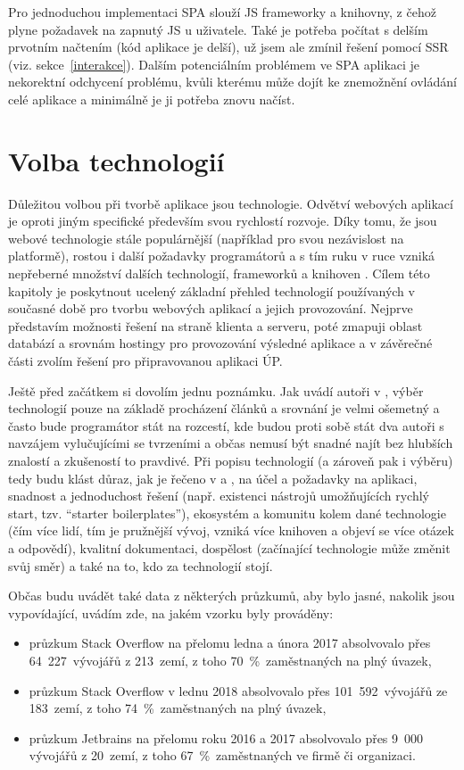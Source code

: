         Pro jednoduchou implementaci SPA slouží JS frameworky a knihovny, z čehož plyne požadavek na zapnutý JS u uživatele. Také je potřeba počítat s delším prvotním načtením (kód aplikace je delší), už jsem ale zmínil řešení pomocí SSR (viz. sekce~\ref{interakce}). Dalším potenciálním problémem ve SPA aplikaci je nekorektní odchycení problému, kvůli kterému může dojít ke znemožnění ovládání celé aplikace a minimálně je ji potřeba znovu načíst. \cite{spa1}

\chapter{Volba technologií}\label{technologie}
Důležitou volbou při tvorbě aplikace jsou technologie. Odvětví webových aplikací je oproti jiným specifické především svou rychlostí rozvoje. Díky tomu, že jsou webové technologie stále populárnější (například pro svou nezávislost na platformě), rostou i další požadavky programátorů a s tím ruku v ruce vzniká nepřeberné množství dalších technologií, frameworků a knihoven \cite{moderni-webapps,moderni-webapps2}. Cílem této kapitoly je poskytnout ucelený základní přehled technologií používaných v současné době pro tvorbu webových aplikací a jejich provozování. Nejprve představím možnosti řešení na straně klienta a serveru, poté zmapuji oblast databází a srovnám hostingy pro provozování výsledné aplikace a v závěrečné části zvolím řešení pro připravovanou aplikaci ÚP.

Ještě před začátkem si dovolím jednu poznámku. Jak uvádí autoři v \cite{technologie1}, výběr technologií pouze na základě procházení článků a srovnání je velmi ošemetný a často bude programátor stát na rozcestí, kde budou proti sobě stát dva autoři s navzájem vylučujícími se tvrzeními a občas nemusí být snadné najít bez hlubších znalostí a zkušeností to pravdivé. Při popisu technologií (a zároveň pak i výběru) tedy budu klást důraz, jak je řečeno v \cite{technologie1} a \cite{technologie2}, na účel a požadavky na aplikaci, snadnost a jednoduchost řešení (např. existenci nástrojů umožňujících rychlý start, tzv. \enquote{starter boilerplates}), ekosystém a komunitu kolem dané technologie (čím více lidí, tím je pružnější vývoj, vzniká více knihoven a objeví se více otázek a odpovědí), kvalitní dokumentaci, dospělost (začínající technologie může změnit svůj směr) a také na to, kdo za technologií stojí.

Občas budu uvádět také data z některých průzkumů, aby bylo jasné, nakolik jsou vypovídající, uvádím zde, na jakém vzorku byly prováděny:
\begin{itemize}
    \item průzkum Stack Overflow \cite{stack-stats17} na přelomu ledna a února 2017 absolvovalo přes 64~227~vývojářů z 213~zemí, z toho 70~\%~zaměstnaných na plný úvazek,
    \item průzkum Stack Overflow \cite{stack-stats18} v lednu 2018 absolvovalo přes 101~592~vývojářů ze 183~zemí, z toho 74~\%~zaměstnaných na plný úvazek,
    \item průzkum Jetbrains \cite{jetbrains-stats} na přelomu roku 2016 a 2017 absolvovalo přes 9~000 vývojářů z 20~zemí, z toho 67~\%~zaměstnaných ve firmě či organizaci.
\end{itemize}

